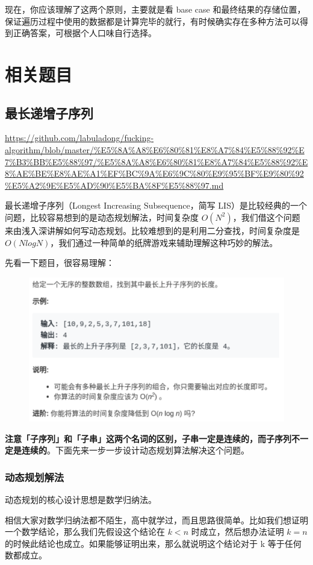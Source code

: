 \documentclass[12pt]{article}
\begin{document}
现在，你应该理解了这两个原则，主要就是看 base case 和最终结果的存储位置，保证遍历过程中使用的数据都是计算完毕的就行，有时候确实存在多种方法可以得到正确答案，可根据个人口味自行选择。

\section{相关题目}
\subsection{最长递增子序列}
\url{https://github.com/labuladong/fucking-algorithm/blob/master/%E5%8A%A8%E6%80%81%E8%A7%84%E5%88%92%E7%B3%BB%E5%88%97/%E5%8A%A8%E6%80%81%E8%A7%84%E5%88%92%E8%AE%BE%E8%AE%A1%EF%BC%9A%E6%9C%80%E9%95%BF%E9%80%92%E5%A2%9E%E5%AD%90%E5%BA%8F%E5%88%97.md}

最长递增子序列（Longest Increasing Subsequence，简写 LIS）是比较经典的一个问题，比较容易想到的是动态规划解法，时间复杂度 $O(N^2)$，我们借这个问题来由浅入深讲解如何写动态规划。比较难想到的是利用二分查找，时间复杂度是 $O(NlogN)$，我们通过一种简单的纸牌游戏来辅助理解这种巧妙的解法。

先看一下题目，很容易理解：
\begin{figure}[H]
    \centering
    \includegraphics[width=.8\textwidth]{fig/Dynamic_Programming_Longest_Increasing Subsequence_1.png}
\end{figure}

\textbf{注意「子序列」和「子串」这两个名词的区别，子串一定是连续的，而子序列不一定是连续的}。下面先来一步一步设计动态规划算法解决这个问题。

\subsubsection{动态规划解法}
动态规划的核心设计思想是数学归纳法。

相信大家对数学归纳法都不陌生，高中就学过，而且思路很简单。比如我们想证明一个数学结论，那么我们先假设这个结论在 $k<n$ 时成立，然后想办法证明 $k=n$ 的时候此结论也成立。如果能够证明出来，那么就说明这个结论对于 k 等于任何数都成立。
\end{document}
